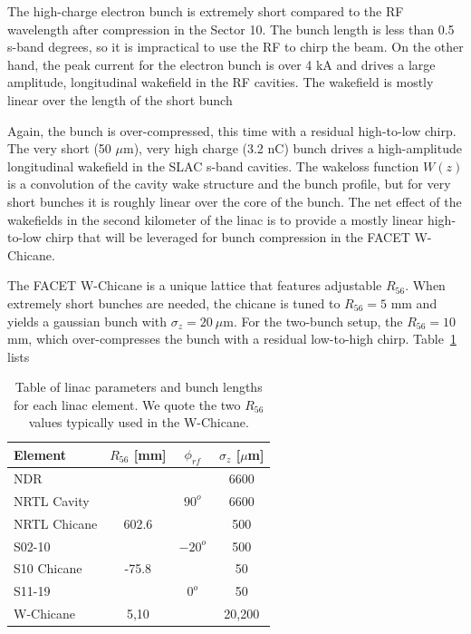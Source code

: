 \documentclass[%
twocolumn,
showpacs,preprintnumbers,
 aps,
prstab,
]{revtex4-1}
\begin{document}
The high-charge electron bunch is extremely short compared to the RF wavelength after compression in the Sector 10. The bunch length is less than 0.5 s-band degrees, so it is impractical to use the RF to chirp the beam. On the other hand, the peak current for the electron bunch is over 4 kA and drives a large amplitude, longitudinal wakefield in the RF cavities. The wakefield is mostly linear over the length of the short bunch

Again, the bunch is over-compressed, this time with a residual high-to-low chirp. The very short (50 $\mu$m), very high charge (3.2 nC) bunch drives a high-amplitude longitudinal wakefield in the SLAC s-band cavities. The wakeloss function $W(z)$ is a convolution of the cavity wake structure and the bunch profile, but for very short bunches it is roughly linear over the core of the bunch. The net effect of the wakefields in the second kilometer of the linac is to provide a mostly linear high-to-low chirp that will be leveraged for bunch compression in the FACET W-Chicane.

The FACET W-Chicane is a unique lattice that features adjustable $R_{56}$.  When extremely short bunches are needed, the chicane is tuned to $R_{56} = 5$ mm and yields a gaussian bunch with $\sigma_z = 20~\mu$m. For the two-bunch setup, the $R_{56} = 10$ mm, which over-compresses the bunch with a residual low-to-high chirp. Table~\ref{dat_table} lists 

\begin{table}
  \begin{tabular}{ l c c c}
    \hline
    Element & $R_{56}$ [mm] & $\phi_{rf}$ & $\sigma_z$ [$\mu$m] \\ \hline
    NDR &  & & 6600 \\
    NRTL Cavity &  & $ 90^o$ & 6600 \\
    NRTL Chicane & 602.6 & & 500 \\
    S02-10 &  & $-20^o$ & 500 \\
    S10 Chicane & -75.8 & & 50 \\
    S11-19 & & $0^o$ & 50 \\
    W-Chicane & 5,10 & & 20,200 \\
    \hline
  \end{tabular}
   \caption{Table of linac parameters and bunch lengths for each linac element. We quote the two $R_{56}$ values typically used in the W-Chicane.}
   \label{dat_table}
\end{table}

\end{document}

